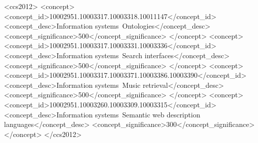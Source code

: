 \documentclass[sigconf]{acmart}
\begin{document}
%
%
\begin{CCSXML}
<ccs2012>
<concept>
<concept_id>10002951.10003317.10003318.10011147</concept_id>
<concept_desc>Information systems~Ontologies</concept_desc>
<concept_significance>500</concept_significance>
</concept>
<concept>
<concept_id>10002951.10003317.10003331.10003336</concept_id>
<concept_desc>Information systems~Search interfaces</concept_desc>
<concept_significance>500</concept_significance>
</concept>
<concept>
<concept_id>10002951.10003317.10003371.10003386.10003390</concept_id>
<concept_desc>Information systems~Music retrieval</concept_desc>
<concept_significance>500</concept_significance>
</concept>
<concept>
<concept_id>10002951.10003260.10003309.10003315</concept_id>
<concept_desc>Information systems~Semantic web description languages</concept_desc>
<concept_significance>300</concept_significance>
</concept>
</ccs2012>
\end{CCSXML}




\acmPrice{}

\maketitle

\setdefaultleftmargin{0.5cm}{1.5cm}{}{}{}{}




 
\end{document}
